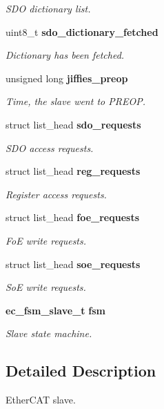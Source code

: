 \begin{DoxyCompactItemize}
\begin{DoxyCompactList}\small\item\em \-S\-D\-O dictionary list. \end{DoxyCompactList}\item 
uint8\-\_\-t {\bf sdo\-\_\-dictionary\-\_\-fetched}
\begin{DoxyCompactList}\small\item\em \-Dictionary has been fetched. \end{DoxyCompactList}\item 
unsigned long {\bf jiffies\-\_\-preop}
\begin{DoxyCompactList}\small\item\em \-Time, the slave went to \-P\-R\-E\-O\-P. \end{DoxyCompactList}\item 
struct list\-\_\-head {\bf sdo\-\_\-requests}
\begin{DoxyCompactList}\small\item\em \-S\-D\-O access requests. \end{DoxyCompactList}\item 
struct list\-\_\-head {\bf reg\-\_\-requests}
\begin{DoxyCompactList}\small\item\em \-Register access requests. \end{DoxyCompactList}\item 
struct list\-\_\-head {\bf foe\-\_\-requests}
\begin{DoxyCompactList}\small\item\em \-Fo\-E write requests. \end{DoxyCompactList}\item 
struct list\-\_\-head {\bf soe\-\_\-requests}
\begin{DoxyCompactList}\small\item\em \-So\-E write requests. \end{DoxyCompactList}\item 
{\bf ec\-\_\-fsm\-\_\-slave\-\_\-t} {\bf fsm}
\begin{DoxyCompactList}\small\item\em \-Slave state machine. \end{DoxyCompactList}\end{DoxyCompactItemize}


\subsection{\-Detailed \-Description}
\-Ether\-C\-A\-T slave. 

